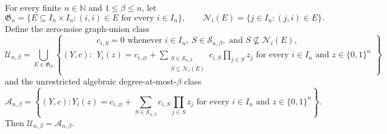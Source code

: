 For every finite \(n\in\mathbb N\) and \(1\leq\beta\leq n\), let
\[
\mathfrak G_n
=
\bigl\{E\subseteq I_n\times I_n:(i,i)\in E
\text{ for every }i\in I_n\bigr\},
\qquad
\mathcal N_i(E)=\{j\in I_n:(j,i)\in E\}.
\]
Define the zero-noise graph-union class
\[
\mathcal U_{n,\beta}
=
\bigcup_{E\in\mathfrak G_n}
\left\{(Y,c):
\begin{array}{l}
c_{i,S}=0\text{ whenever }i\in I_n,\ S\in\mathcal S_{n,\beta},
\text{ and }S\nsubseteq\mathcal N_i(E),\\
Y_i(z)=c_{i,\varnothing}+
\displaystyle\sum_{\substack{S\in\mathcal S_{n,\beta}\\S\subseteq\mathcal N_i(E)}}
c_{i,S}\prod_{j\in S}z_j
\text{ for every }i\in I_n\text{ and }z\in\{0,1\}^n
\end{array}
\right\}
\]
and the unrestricted algebraic degree-at-most-\(\beta\) class
\[
\mathcal A_{n,\beta}
=
\left\{(Y,c):
Y_i(z)=c_{i,\varnothing}
+\sum_{S\in\mathcal S_{n,\beta}}c_{i,S}\prod_{j\in S}z_j
\text{ for every }i\in I_n\text{ and }z\in\{0,1\}^n
\right\}.
\]
Then \(\mathcal U_{n,\beta}=\mathcal A_{n,\beta}\).